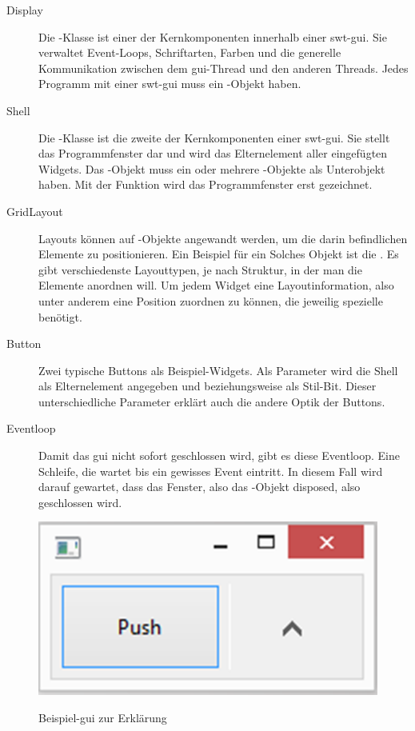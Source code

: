 \begin{description}
	\item[{Display}]
    Die -Klasse ist einer der Kernkomponenten innerhalb einer \acrshort{swt}-\acrshort{gui}.
    Sie verwaltet Event-Loops, Schriftarten, Farben und die generelle Kommunikation zwischen dem \acrshort{gui}-Thread
    und den anderen Threads. Jedes Programm mit einer \acrshort{swt}-\acrshort{gui} muss ein -Objekt haben.

    \item[{Shell}]
    Die -Klasse ist die zweite der Kernkomponenten einer \acrshort{swt}-\acrshort{gui}.
    Sie stellt das Programmfenster dar und wird das Elternelement aller eingefügten Widgets.
		Das -Objekt muss ein oder mehrere -Objekte als Unterobjekt haben.
    Mit der Funktion  wird das Programmfenster erst gezeichnet.

    \item[{GridLayout}]
    Layouts können auf -Objekte angewandt werden, um die darin befindlichen
		Elemente zu positionieren. Ein Beispiel für ein Solches Objekt ist die .
    Es gibt verschiedenste Layouttypen, je nach Struktur, in der man die Elemente anordnen will.
    Um jedem Widget eine Layoutinformation, also unter anderem eine Position zuordnen zu können,
		die jeweilig spezielle  benötigt.

    \item[{Button}]
    Zwei typische Buttons als Beispiel-Widgets. Als Parameter wird die Shell als
    Elternelement angegeben und  beziehungsweise 
    als Stil-Bit. Dieser unterschiedliche Parameter erklärt auch die andere Optik
    der Buttons.

    \item[{Eventloop}]
    Damit das \acrshort{gui} nicht sofort geschlossen wird, gibt es diese Eventloop.
		Eine Schleife, die wartet bis ein gewisses Event eintritt. In diesem Fall wird
		darauf gewartet, dass das Fenster, also das -Objekt disposed, also
		geschlossen wird.

\end{description}

\begin{figure}[htb]
	\centering
	\includegraphics[]{images/erklaerungsgui.png}
	\label{erklaerungsgui}
  \caption{Beispiel-\acrshort{gui} zur Erklärung}
\end{figure}
